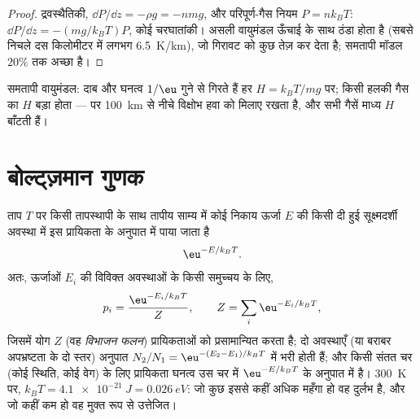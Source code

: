 \begin{proof}
द्रवस्थैतिकी, $\dd P/\dd z = -\rho g = -nmg$, और परिपूर्ण-गैस नियम $P
= nk_BT$: $\dd P/\dd z = -(mg/k_BT)P$, कोई चरघातांकी। असली
वायुमंडल ऊँचाई के साथ ठंडा होता है (सबसे निचले दस किलोमीटर में लगभग
\qty{6.5}{K/km}), जो गिरावट को कुछ तेज़ कर देता है; समतापी
मॉडल $20\%$ तक अच्छा है।
\end{proof}

\begin{omfigure}

{\small समतापी वायुमंडल: दाब और घनत्व $1/\eu$ गुने से गिरते हैं हर
 $H = k_BT/mg$ पर; किसी हलकी गैस का $H$ बड़ा होता
--- पर \qty{100}{km} से नीचे विक्षोभ हवा को मिलाए रखता है, और सभी
गैसें माध्य $H$ बाँटती हैं।}
\end{omfigure}

\section{बोल्ट्ज़मान गुणक}

\begin{theorem}[बोल्ट्ज़मान गुणक]\label{thm:b2:boltzmann-factor:factor}
ताप $T$ पर किसी तापस्थापी के साथ तापीय साम्य में कोई निकाय
ऊर्जा $E$ की किसी दी हुई सूक्ष्मदर्शी अवस्था में इस
प्रायिकता के अनुपात में पाया जाता है
\[
\eu^{-E/k_BT} .
\]
अतः, ऊर्जाओं $E_i$ की विविक्त अवस्थाओं के किसी समुच्चय के लिए,
\[
p_i = \frac{\eu^{-E_i/k_BT}}{Z}, \qquad Z = \sum_i\eu^{-E_i/k_BT} ,
\]
जिसमें योग $Z$ (वह \emph{विभाजन फलन})
प्रायिकताओं को प्रसामान्यित करता है; दो अवस्थाएँ (या बराबर
अपभ्रष्टता के दो स्तर) अनुपात $N_2/N_1 = \eu^{-(E_2 - E_1)/k_BT}$ में भरी होती हैं;
और किसी संतत चर (कोई स्थिति, कोई वेग) के लिए प्रायिकता
घनत्व उस चर में $\eu^{-E/k_BT}$ के अनुपात में है।
\qty{300}{K} पर, $k_BT = \qty{4.1e-21}{J} = \qty{0.026}{eV}$: जो कुछ इससे
कहीं अधिक महँगा हो वह दुर्लभ है, और जो कहीं कम हो वह
मुक्त रूप से उत्तेजित।
\end{theorem}

